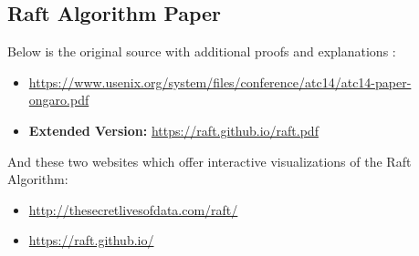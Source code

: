 \subsection{Raft Algorithm Paper}
Below is the original source with additional proofs and explanations \cite{184040}:
\begin{itemize}
    \item \href{https://www.usenix.org/system/files/conference/atc14/atc14-paper-ongaro.pdf}{https://www.usenix.org/system/files/conference/atc14/atc14-paper-ongaro.pdf}
    \item \textbf{Extended Version:} \href{https://raft.github.io/raft.pdf}{https://raft.github.io/raft.pdf}
\end{itemize}

\noindent
And these two websites which offer interactive visualizations of the Raft Algorithm:
\begin{itemize}
    \item \href{http://thesecretlivesofdata.com/raft/}{http://thesecretlivesofdata.com/raft/}
    \item \href{https://raft.github.io/}{https://raft.github.io/}
\end{itemize}


